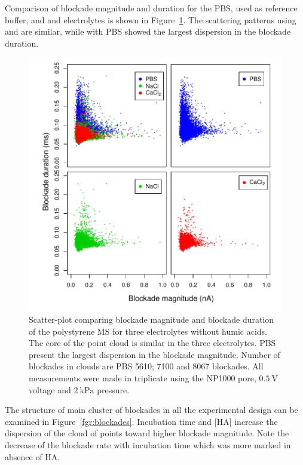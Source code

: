 \documentclass[journal=langd5,manuscript=article]{achemso}
\begin{document}
Comparison of 
blockade magnitude and duration 
for the PBS, used as reference  buffer, and  and  electrolytes is shown in Figure~\ref{fgr:pairs_buffers}.
The scattering patterns using    and  are
similar, while with PBS showed the largest dispersion 
in the blockade duration.
 \begin{figure}
  \includegraphics[width=\linewidth]{Figures/Raw_Pairs_buffers_MS_T0_Fwhm.pdf}
  \caption{Scatter-plot comparing  blockade magnitude and
  blockade duration of  the polystyrene MS for three
  electrolytes without humic acids. The core of the point cloud is similar in
  the three electrolytes. PBS  present the largest 
  dispersion in the blockade magnitude. Number of blockades in clouds are PBS 5610;  7100 and  8067 blockades. All measurements were made in triplicate using the NP1000 pore,
$0.5~\mathrm{V}$ voltage 
and
$2~\mathrm{kPa}$ pressure.} 
  \label{fgr:pairs_buffers}
\end{figure}






The  structure of  main cluster of blockades in all the experimental design can be examined in Figure~\ref{fgr:blockades}. Incubation time and [HA]  increase the dispersion of the cloud of points toward higher blockade magnitude. Note the decrease of the blockade rate with incubation time which was more marked in absence of HA.
\end{document}
